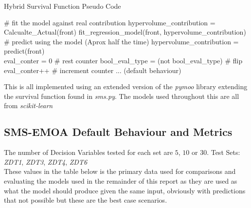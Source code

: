 \documentclass[sigconf,review,nonacm]{acmart}
\begin{document}
\begin{algorithm}
	\caption{Hybrid Survival Function Pseudo Code} 
	\begin{algorithmic}[1]

                \State \# fit the model against real contribution 
                \State hypervolume\_contribution = Calcualte\_Actual(front)
                \State fit\_regression\_model(front, hypervolume\_contribution)
                \State \# predict using the model  (Aprox half the time)
                \State hypervolume\_contribution = predict(front)       
            \EndIf \\
            
                \State eval\_conter = 0                                \# rest counter
                \State bool\_eval\_type = (not bool\_eval\_type)       \# flip 
            \Else
                \State eval\_conter++                                  \# increment counter 
            \EndIf
            ... (default behaviour)
	\end{algorithmic} 
\end{algorithm}

\noindent This is all implemented using an extended version of the \textit{pymoo} \cite{pymoo} library extending the survival function found in \textit{sms.py}. The models used throughout this are all from \textit{scikit-learn} \cite{scikit-learn}

 \subsection{SMS-EMOA Default Behaviour and Metrics}

The number of Decision Variables tested for each set are $5$, $10$ or $30$. 
Test Sets: \textit{ZDT1}, \textit{ZDT3}, \textit{ZDT4}, \textit{ZDT6} \\

\noindent These values in the table below is the primary data used for comparisons and evaluating the models used in the remainder of this report as they are used as what the model should produce given the same input, obviously with predictions that not possible but these are the best case scenarios. 
\end{document}

